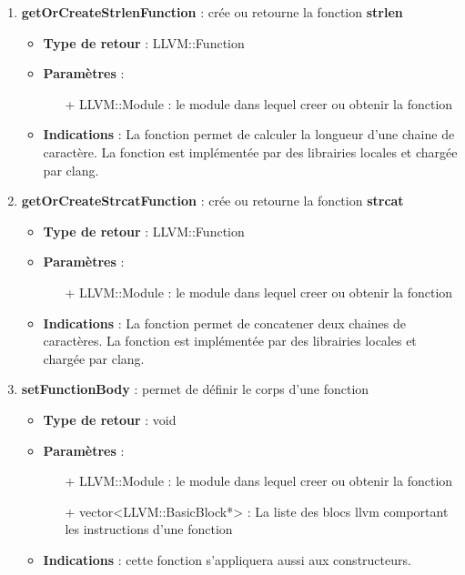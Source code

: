 \documentclass{article}
\begin{document}
\begin{enumerate}
  \item \textbf{getOrCreateStrlenFunction} : crée ou retourne la fonction \textbf{strlen}
  \begin{itemize}
    \item \textbf{Type de retour} : LLVM::Function
    \item \textbf{Paramètres} :
    \begin{enumerate}
      \item[+] LLVM::Module : le module dans lequel creer ou obtenir la fonction
    \end{enumerate}
    \item \textbf{Indications} : La fonction permet de calculer la longueur d'une chaine de caractère. La fonction est implémentée par des librairies locales et chargée par clang.
  \end{itemize}

  \item \textbf{getOrCreateStrcatFunction} : crée ou retourne la fonction \textbf{strcat}
  \begin{itemize}
    \item \textbf{Type de retour} : LLVM::Function
    \item \textbf{Paramètres} :
    \begin{enumerate}
      \item[+] LLVM::Module : le module dans lequel creer ou obtenir la fonction
    \end{enumerate}
    \item \textbf{Indications} : La fonction permet de concatener deux chaines de caractères. La fonction est implémentée par des librairies locales et chargée par clang.
  \end{itemize}

  \item \textbf{setFunctionBody} : permet de définir le corps d'une fonction
  \begin{itemize}
    \item \textbf{Type de retour} : void
    \item \textbf{Paramètres} :
    \begin{enumerate}
      \item[+] LLVM::Module : le module dans lequel creer ou obtenir la fonction
      \item[+] vector<LLVM::BasicBlock*> : La liste des blocs llvm comportant les instructions d'une fonction
    \end{enumerate}
    \item \textbf{Indications} : cette fonction s'appliquera aussi aux constructeurs.
  \end{itemize}

  \end{enumerate}
\end{document}
